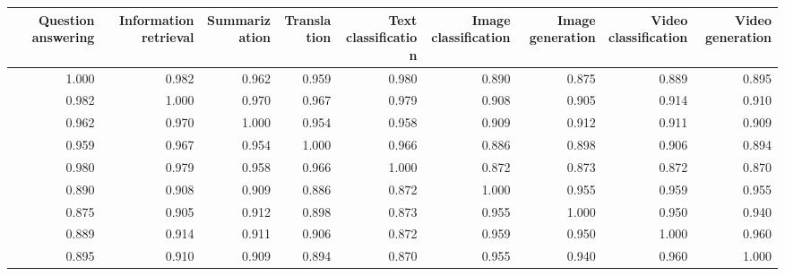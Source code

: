 \begin{tabular}{rrrrrrrrr}
\toprule
Question answering & Information retrieval & Summarization & Translation & Text classification & Image classification & Image generation & Video classification & Video generation \\
\midrule
1.000 & 0.982 & 0.962 & 0.959 & 0.980 & 0.890 & 0.875 & 0.889 & 0.895 \\
0.982 & 1.000 & 0.970 & 0.967 & 0.979 & 0.908 & 0.905 & 0.914 & 0.910 \\
0.962 & 0.970 & 1.000 & 0.954 & 0.958 & 0.909 & 0.912 & 0.911 & 0.909 \\
0.959 & 0.967 & 0.954 & 1.000 & 0.966 & 0.886 & 0.898 & 0.906 & 0.894 \\
0.980 & 0.979 & 0.958 & 0.966 & 1.000 & 0.872 & 0.873 & 0.872 & 0.870 \\
0.890 & 0.908 & 0.909 & 0.886 & 0.872 & 1.000 & 0.955 & 0.959 & 0.955 \\
0.875 & 0.905 & 0.912 & 0.898 & 0.873 & 0.955 & 1.000 & 0.950 & 0.940 \\
0.889 & 0.914 & 0.911 & 0.906 & 0.872 & 0.959 & 0.950 & 1.000 & 0.960 \\
0.895 & 0.910 & 0.909 & 0.894 & 0.870 & 0.955 & 0.940 & 0.960 & 1.000 \\
\bottomrule
\end{tabular}

